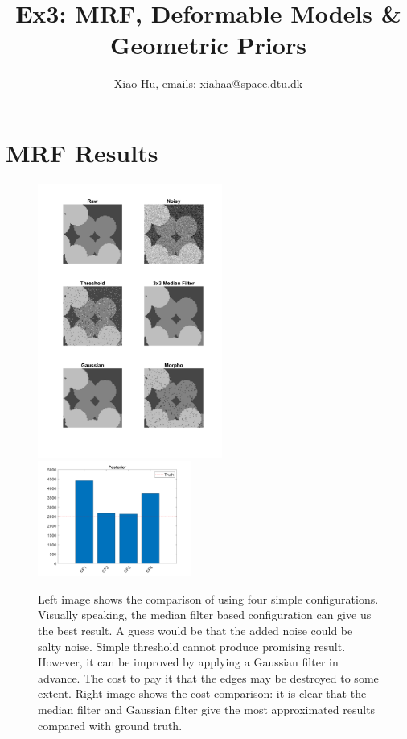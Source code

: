 \documentclass[a4paper]{article}
\title{Ex3: MRF, Deformable Models \& Geometric Priors}
\author{Xiao Hu, emails: \url{xiahaa@space.dtu.dk}}
\begin{document}
	\maketitle
	\thispagestyle{empty}
	\section{MRF Results}
	\begin{figure}[htbp]
	\centering
	\includegraphics[width=0.54\textwidth]{./figures/res2.png}
	\includegraphics[width=0.45\textwidth]{./figures/res4.png}
	\caption{Left image shows the comparison of using four simple configurations. Visually speaking, the median filter based configuration can give us the best result. A guess would be that the added noise could be salty noise. Simple threshold cannot produce promising result. However, it can be improved by applying a Gaussian filter in advance. The cost to pay it that the edges may be destroyed to some extent. Right image shows the cost comparison: it is clear that the median filter and Gaussian filter give the most approximated results compared with ground truth.}
\end{figure}
\end{document}
